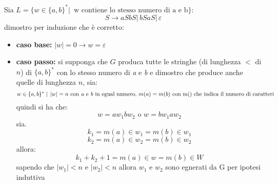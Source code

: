 \begin{example}
	Sia $L=\{w\in\{a,b\}^*|\, \mbox{ w contiene lo stesso numero di a e b}\}$:
	$$S\to aSbS|\,bSaS|\, \varepsilon$$
	dimostro per induzione che è corretto:
	\begin{itemize}
		\item \textbf{caso base:} $|w|=0\to w=\varepsilon$
		\item \textbf{caso passo:} si supponga che $G$ produca tutte le stringhe (di lunghezza $<$ di $n$) di $\{a,b\}^*$ con lo stesso numero di \textit{a} e \textit{b} e dimostro che produce anche quelle di lunghezza $n$, sia:
					$$w\in \{a,b\}^* \mid\, |w|=n \mbox{ con\textit{ a} e \textit{b} in egual numero, }m(a)=m(b) \mbox{ con m() che indica il numero di caratteri}$$
					quindi si ha che:
					$$w=aw_1bw_2\mbox{ o } w=bw_1aw_2$$
					sia.
					$$k_1=m(a)\in w_1=m(b)\in w_1$$
					$$k_2=m(a)\in w_2=m(b)\in w_2$$
					allora:
					$$k_1+k_2+1=m(a)\in w= m(b)\in W$$
					sapendo che $|w_1|<n$ e $|w_2|<n$ allora $w_1$ e $w_2$ sono egnerati da G per ipotesi induttiva
	\end{itemize}
\end{example}

